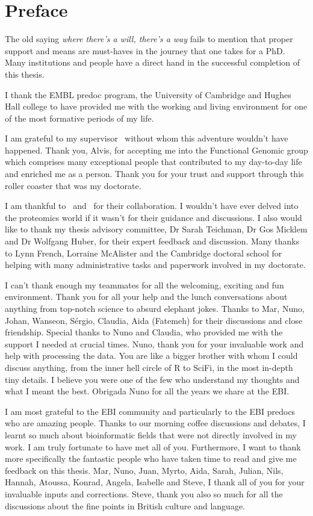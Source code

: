 \chapter*{Preface}
\label{ch:acknowledgements}
\vspace{-1cm}
The old saying \emph{where there's a will, there's a way} fails to mention that
proper support and means are must-haves in the journey that one takes for a PhD.
Many institutions and people have
a direct hand in the successful completion of this thesis.

I thank the EMBL predoc program, the University of Cambridge
and Hughes Hall college to have provided me
with the working and living environment
for one of the most formative periods of my life.

I am grateful to my supervisor \alvis\
without whom this adventure wouldn't have happened.
Thank you, Alvis, for accepting me into the Functional Genomic group
which comprises many exceptional people
that contributed to my day-to-day life and enriched me as a person.
Thank you for your trust and support
through this roller coaster that was my doctorate.

I am thankful to \jyoti\ and \james\ for their collaboration.
I wouldn't have ever delved into the proteomics world
if it wasn't for their guidance and discussions.
I also would like to thank my thesis advisory committee,
Dr Sarah Teichman, Dr Gos Micklem and Dr Wolfgang Huber,
for their expert feedback and discussion.
Many thanks to Lynn French, Lorraine McAlister and the Cambridge doctoral school
for helping with many administrative tasks and paperwork involved in my doctorate.

I can't thank enough my teammates for all the welcoming,
exciting and fun environment.
Thank you for all your help and the lunch conversations about anything
from top-notch science to absurd elephant jokes.
Thanks to Mar, Nuno, Johan, Wanseon, Sérgio, Claudia, Aida (Fatemeh)
for their discussions and close friendship.
Special thanks to Nuno and Claudia,
who provided me with the support I needed at crucial times.
Nuno, thank you for your invaluable work and help with processing the data.
You are like a bigger brother with whom I could discuss anything,
from the inner hell circle of R to SciFi, in the most in-depth tiny details.
I believe you were one of the few who understand my thoughts and what I meant the best.
Obrigada Nuno for all the years we share at the EBI.\@

I am most grateful to the EBI community and
particularly to the EBI predocs who are amazing people.
Thanks to our morning coffee discussions and debates,
I learnt so much about bioinformatic fields that
were not directly involved in my work.
I am truly fortunate to have met all of you.
Furthermore, I want to thank more specifically the fantastic people
who have taken time to read and give me feedback on this thesis.
Mar, Nuno, Juan, Myrto, Aida, Sarah, Julian, Nils,
Hannah, Atoussa, Konrad, Angela,
Isabelle and Steve, I thank all of you for your invaluable inputs and corrections.
Steve, thank you also so much for all the discussions
about the fine points in British culture and language.

